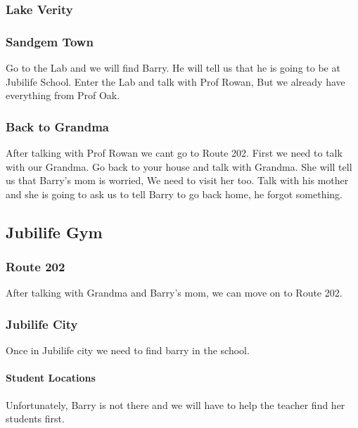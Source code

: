 \documentclass[11pt]{article}
\begin{document}
\subsubsection{Lake Verity}\label{subsubsec:lake_verity}




\subsubsection{Sandgem Town}\label{subsubsec:sandgem-town}
Go to the Lab and we will find Barry.
He will tell us that he is going to be at Jubilife School.
Enter the Lab and talk with Prof Rowan, But we already have everything from Prof Oak.

\subsubsection{Back to Grandma}\label{subsubsec:back-to-grandma}
After talking with Prof Rowan we cant go to Route 202.
First we need to talk with our Grandma.
Go back to your house and talk with Grandma.
She will tell us that Barry's mom is worried, We need to visit her too.
Talk with his mother and she is going to ask us to tell Barry to go back home, he forgot something.

\subsection{Jubilife Gym}\label{subsec:jubilife-gym}

\subsubsection{Route 202}\label{subsubsec:route_202}
After talking with Grandma and Barry's mom, we can move on to Route 202.




\subsubsection{Jubilife City}\label{subsubsec:jubilife-city}
Once in Jubilife city we need to find barry in the school.

\paragraph{Student Locations}\label{par:student-locations}
Unfortunately, Barry is not there and we will have to help the teacher find her students first.
\end{document}
